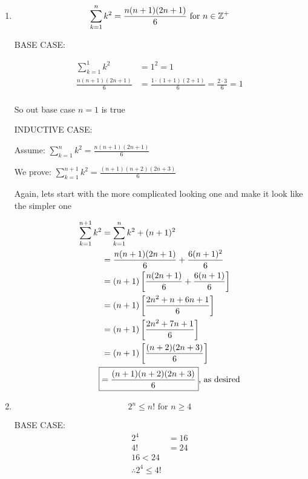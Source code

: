 \documentclass[../../Main.tex]{subfiles}
\begin{document}
\begin{example}
\begin{enumerate}
        \item
        {
            $$\sum_{k = 1}^{n} k^2 = \frac{n (n + 1)(2n + 1)}{6} \text{ for } n \in \mathbb{Z}^+$$

            \begin{poof}
                BASE CASE:

                \begin{align*}
                    \sum_{k = 1}^{1} k^2 &= 1^2 = 1 \\
                    \frac{n (n + 1)(2n + 1)}{6} &= \frac{1 \cdot (1 + 1)(2 + 1)}{6} = \frac{2 \cdot 3}{6} = 1 \\
                \end{align*}

                So out base case $n = 1$ is true
                
                INDUCTIVE CASE:

                Assume: $\sum_{k = 1}^{n} k^2 = \frac{n (n + 1)(2n + 1)}{6}$

                We prove: $\sum_{k = 1}^{n + 1} k^2 = \frac{(n + 1)(n + 2)(2n + 3)}{6}$

                Again, lets start with the more complicated looking one and make it look like the simpler one

                \begin{align*}
                    \sum_{k = 1}^{n + 1} k^2 &= \sum_{k = 1}^{n} k^2 + (n + 1)^2 \\
                    &= \frac{n (n + 1)(2n + 1)}{6} + \frac{6(n + 1)^2}{6} \\ 
                    &= (n + 1)\left[ \frac{n(2n + 1)}{6} + \frac{6(n + 1)}{6} \right] \\
                    &= (n + 1)\left[ \frac{2n^2 + n + 6n + 1}{6} \right] \\
                    &= (n + 1)\left[ \frac{2n^2 + 7n + 1}{6} \right] \\
                    &= (n + 1)\left[ \frac{(n + 2)(2n + 3)}{6} \right] \\
                    \Aboxed{&= \frac{(n + 1)(n + 2)(2n + 3)}{6}} \text{, as desired} \\
                \end{align*}
            \end{poof}
        }

        \item
        {
            $$2^n \leq n! \text{ for } n \geq 4$$

            \begin{poof}
                BASE CASE: 
                \begin{align*}
                    2^4 &= 16 \\
                    4! &= 24 \\
                    16 < 24 \\
                    \therefore 2^4 \leq 4!
                \end{align*}


\end{poof}}
\end{enumerate}
\end{example}
\end{document}
